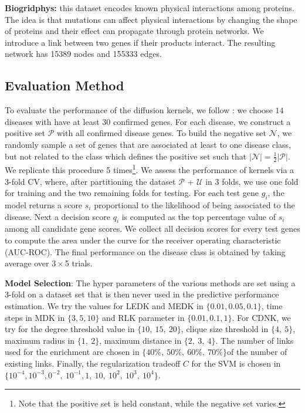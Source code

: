 \textbf{Biogridphys:} this dataset encodes known physical interactions
among proteins. The idea is that mutations can affect physical interactions by
changing the shape of proteins and their effect can propagate through protein
networks. We introduce a link between two genes if their products interact. The resulting network has 15389 nodes and 155333 edges.

\subsection{Evaluation Method}

To evaluate the performance of the diffusion kernels, we follow
\cite{proceeding3}: we choose $14$ diseases with have at least $30$ confirmed
genes. For each disease, we construct a positive set $\mathcal{P}$ with all
confirmed disease genes. To build the negative set $\mathcal{N}$, we randomly
sample a set of genes that are associated at least to one disease class, but
not related to the class which defines the positive set such that $\vert
\mathcal{N} \vert = \frac{1}{2} \vert \mathcal{P} \vert$. We replicate this
procedure 5 times\footnote{Note that the positive set is held constant, while
the negative set varies.}. We assess the performance of kernels via a 3-fold
CV, where, after partitioning  the dataset $\mathcal{P}$ + $\mathcal{U}$ in 3
folds, we use one fold for training and the two remaining folds for testing.
For each test gene $g_i$, the model returns a score $s_i$ proportional to the
likelihood of being associated to the disease. Next a decision score $q_i$ is
computed as the top percentage value of $s_i$ among all candidate gene scores.
We collect all decision scores for every test genes to compute the area under
the curve for the receiver operating characteristic (AUC-ROC).  The final
performance on the disease class is obtained by taking average over $3\times$5
trials.


\textbf{Model Selection}: The hyper parameters of the various methods are
set using a 3-fold on a dataset set that is then never used in the predictive
performance estimation. We try the values for LEDK and MEDK in $\lbrace  0.01,
0.05, 0.1 \rbrace$, time steps in MDK in $\lbrace 3, 5, 10 \rbrace$ and RLK
parameter in $\lbrace 0.01, 0.1, 1 \rbrace$. For CDNK, we try for the degree
threshold value in $\lbrace 10,\ 15,\ 20 \rbrace$, clique size threshold in
$\lbrace 4,\ 5 \rbrace$, maximum radius in $\lbrace 1,\ 2 \rbrace$, maximum
distance in $\lbrace 2,\ 3,\ 4 \rbrace$. 
The number of links used for the enrichment are chosen in $\lbrace 40\%,\ 50\%,\ 60\%,\ 70\% \rbrace$of the number of existing links. 
Finally, the regularization tradeoff $C$ for the SVM is chosen in $\lbrace 10^{-4}, 10^{-3}, 0^{-2},\ 10^{-1}, 1,\ 10,\ 10^2, \ 10^3,\ 10^4 \rbrace$.
